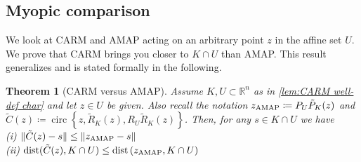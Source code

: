 \documentclass[smallextended,numbook,nospthms]{svjour3}
\theoremstyle{plain}
\newtheorem{theorem}{Theorem}[subsection]
\theoremstyle{definition}
\def\RR{\mathds R}
\DeclareMathOperator{\dist}{dist}
\DeclareMathOperator{\circum}{circ}
\newcommand{\AMAP}{{\rm AMAP}}
\begin{document}
\subsection{Myopic comparison}\label{subsec:myopic comp}

We look at CARM and AMAP acting on an arbitrary point $z$ in the affine set $U$. We prove that CARM brings you closer to $K \cap U$ than AMAP. This result generalizes \cite[Theorem 2]{Behling:2020} and is stated formally in the following.

\begin{theorem}[CARM versus AMAP]\label{thm:CARM x AMAP} Assume $K, U \subset \RR^{n}$ as in  \cref{lem:CARM well-def char} and let $z \in U$ be given. Also recall the notation $z_{\mathrm{\AMAP}}\coloneqq P_{U}\tilde{P}_{K}(z)$ and $\tilde{C}(z)\coloneqq \circum \left\{z, \tilde{R}_{K}(z), R_{U} \tilde{R}_{K}(z)\right\}$.
	Then, for any $s \in K \cap U$ we have\\
	(i) $\|\tilde{C}(z)-s\| \leq\left\|z_{\AMAP}-s\right\|$\\
	(ii) $\dist(\tilde{C}(z), K \cap U) \leq \dist\left(z_{\mathrm{\AMAP}}, K \cap U\right)$
\end{theorem}
\end{document}
